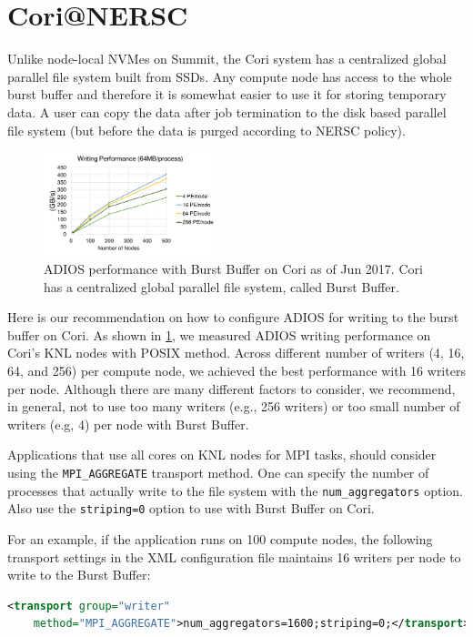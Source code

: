 \section{Cori@NERSC}

Unlike node-local NVMes on Summit, the Cori system has a centralized global parallel file system built from SSDs. Any compute node has access to the whole burst buffer and therefore it is somewhat easier to use it for storing temporary data. A user can copy the data after job termination to the disk based parallel file system (but before the data is purged according to NERSC policy).

\begin{figure}
\center
\includegraphics[width=0.45\textwidth]{figures/Adios_write_on_Cori.pdf}
\caption{ADIOS performance with Burst Buffer on Cori as of Jun 2017. Cori has a centralized global parallel file system, called Burst Buffer.}
\label{fig:cori}
\end{figure}

Here is our recommendation on how to configure ADIOS for writing to the burst buffer on Cori.
As shown in \ref{fig:cori}, we measured ADIOS writing performance on Cori's KNL nodes with POSIX method. Across different number of writers (4, 16, 64, and 256) per compute node, we achieved the best performance with 16 writers per node. Although there are many different factors to consider, we recommend, in general, not to use too many writers (e.g., 256 writers) or too small number of writers (e.g, 4) per node with Burst Buffer.

Applications that use all cores on KNL nodes for MPI tasks, should consider using the \verb+MPI_AGGREGATE+ transport method. One can specify the number of processes that actually write to the file system with the \verb+num_aggregators+ option. Also use the \verb+striping=0+ option to use with Burst Buffer on Cori. 

For an example, if the application runs on 100 compute nodes, the following transport settings in the XML configuration file maintains 16 writers per node to write to the Burst Buffer:
\begin{lstlisting}[language=XML]
<transport group="writer" 
	method="MPI_AGGREGATE">num_aggregators=1600;striping=0;</transport>
\end{lstlisting}



